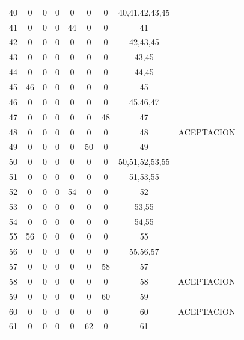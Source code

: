 \begin{longtable}{||c||ccccccc||c||}
40  & 0   & 0  & 0  & 0   & 0   & 0   & 40,41,42,43,45          &             \\
41  & 0   & 0  & 0  & 44  & 0   & 0   & 41                      &             \\
42  & 0   & 0  & 0  & 0   & 0   & 0   & 42,43,45                &             \\
43  & 0   & 0  & 0  & 0   & 0   & 0   & 43,45                   &             \\
44  & 0   & 0  & 0  & 0   & 0   & 0   & 44,45                   &             \\
45  & 46  & 0  & 0  & 0   & 0   & 0   & 45                      &             \\
46  & 0   & 0  & 0  & 0   & 0   & 0   & 45,46,47                &             \\
47  & 0   & 0  & 0  & 0   & 0   & 48  & 47                      &             \\
48  & 0   & 0  & 0  & 0   & 0   & 0   & 48                      & ACEPTACION  \\
49  & 0   & 0  & 0  & 0   & 50  & 0   & 49                      &             \\
50  & 0   & 0  & 0  & 0   & 0   & 0   & 50,51,52,53,55          &             \\
51  & 0   & 0  & 0  & 0   & 0   & 0   & 51,53,55                &             \\
52  & 0   & 0  & 0  & 54  & 0   & 0   & 52                      &             \\
53  & 0   & 0  & 0  & 0   & 0   & 0   & 53,55                   &             \\
54  & 0   & 0  & 0  & 0   & 0   & 0   & 54,55                   &             \\
55  & 56  & 0  & 0  & 0   & 0   & 0   & 55                      &             \\
56  & 0   & 0  & 0  & 0   & 0   & 0   & 55,56,57                &             \\
57  & 0   & 0  & 0  & 0   & 0   & 58  & 57                      &             \\
58  & 0   & 0  & 0  & 0   & 0   & 0   & 58                      & ACEPTACION  \\
59  & 0   & 0  & 0  & 0   & 0   & 60  & 59                      &             \\
60  & 0   & 0  & 0  & 0   & 0   & 0   & 60                      & ACEPTACION  \\
61  & 0   & 0  & 0  & 0   & 62  & 0   & 61                      &             \\

\end{longtable}
